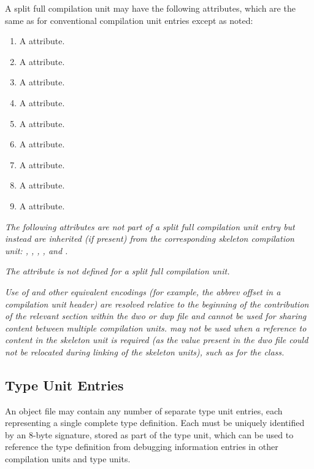 A split full compilation unit
may have the following attributes,
which are the same as for conventional compilation unit entries
except as noted:
\begin{enumerate}[1. ]
\item A \DWATname{} attribute.
\bb
\item A \DWATlanguagename{} attribute.
\item A \DWATlanguageversion{} attribute.
\eb
\item A \DWATmacros{} attribute.\db
\item A \DWATproducer{} attribute.
\item A \DWATidentifiercase{} attribute.
\item A \DWATmainsubprogram{} attribute.
\item A \DWATentrypc{} attribute.
\item A \DWATuseUTFeight{} attribute.

\end{enumerate}

\textit{The following attributes are not part of a
split full compilation unit entry but instead are inherited
(if present) from the corresponding skeleton compilation unit:
\bbeb
\DWATaddrbase{},
\DWATcompdir,
\DWAThighpc,
\DWATlowpc,
\DWATranges{}
\db
and
\DWATstmtlist.\db
}

\textit{The \DWATbasetypes{} attribute is not defined for a
split full compilation unit.}

\bb
\textit{Use of \DWFORMsecoffset{} and other equivalent encodings
(for example, the abbrev offset in a compilation unit header) are resolved
relative to the beginning of the contribution of the relevant
section within the dwo or dwp file and cannot be used for sharing
content between multiple compilation units. \DWFORMsecoffset{} may
not be used when a reference to content in the skeleton unit is
required (as the value present in the dwo file could not be relocated
during linking of the skeleton units), such as for the \CLASSaddrptr{} class.}
\eb

\subsection{Type Unit Entries}
\label{chap:typeunitentries}
An object file may contain any number of separate type
unit entries, each representing a single complete type
definition.
Each  must be uniquely identified by
an 8-byte signature, stored as part of the type unit, which
can be used to reference the type definition from debugging
information entries in other compilation units and type units.

